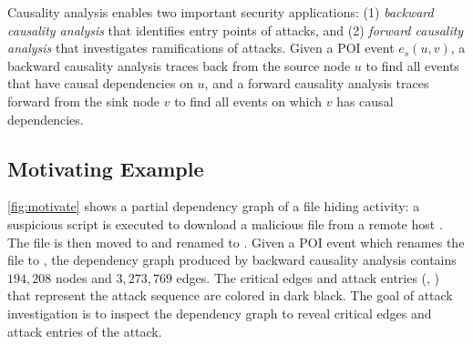 Causality analysis enables two important security applications:
(1) \emph{backward causality analysis} that identifies entry points of attacks, and (2) \emph{forward causality analysis} that investigates ramifications of attacks.
Given a POI event $e_s(u,v)$, a backward causality analysis traces back from the source node $u$ to find all events that have causal dependencies on $u$,
and a forward causality analysis traces forward from the sink node $v$ to find all events on which $v$ has causal dependencies.







\subsection{Motivating Example}
\label{subsec:motivating-example}

\cref{fig:motivate} shows a partial dependency graph of a 
file hiding activity: 
a suspicious script  is executed to download a malicious file  from a remote host . The file is then moved to  and renamed to .
%
Given a POI event which renames the file to , the dependency graph produced by backward causality analysis 
contains $194,208$ nodes and $3,273,769$ edges.
The critical edges and attack entries (, ) that represent the attack sequence are colored in dark black.
%
The goal of attack investigation is to inspect the dependency graph to
reveal critical edges and attack entries of the attack.


